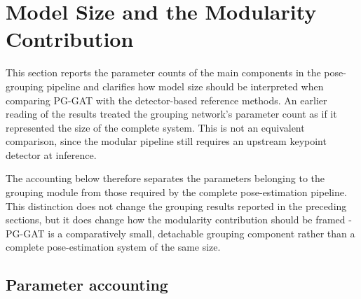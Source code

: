 \section{Model Size and the Modularity Contribution}
\label{sec_res_model_size}

This section reports the parameter counts of the main components in the
pose-grouping pipeline
and clarifies how model size should be interpreted when comparing PG-GAT
with the detector-based reference methods.
An earlier reading of the results treated the grouping network's
parameter count as if it represented the size of the complete system.
This is not an equivalent comparison,
since the modular pipeline still requires an upstream keypoint detector
at inference.

The accounting below therefore separates the parameters belonging to
the grouping module from those required by the complete pose-estimation
pipeline.
This distinction does not change the grouping results reported in the
preceding sections,
but it does change how the modularity contribution should be framed -
PG-GAT is a comparatively small,
detachable grouping component
rather than a complete pose-estimation system of the same size.

\subsection{Parameter accounting}
\label{sec_res_model_size_accounting}

